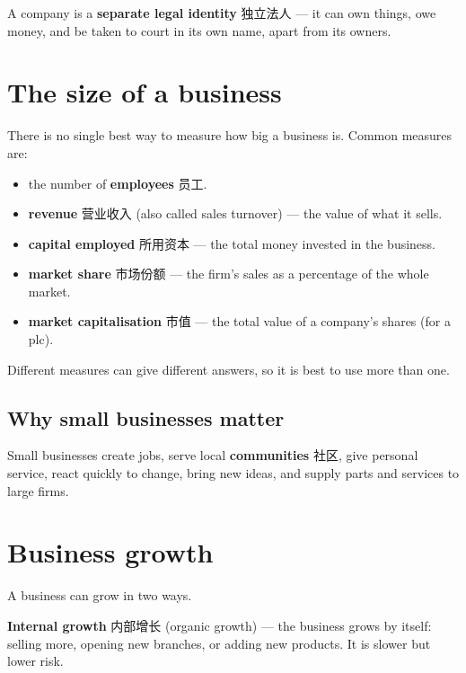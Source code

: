 \documentclass[11pt]{article}
\begin{document}
A company is a \textbf{separate legal identity} 独立法人 — it can own things, owe money, and be taken to court in its own name, apart from its owners.

\section*{The size of a business}

There is no single best way to measure how big a business is. Common measures are:

\begin{itemize}
\item the number of \textbf{employees} 员工.

\item \textbf{revenue} 营业收入 (also called sales turnover) — the value of what it sells.

\item \textbf{capital employed} 所用资本 — the total money invested in the business.

\item \textbf{market share} 市场份额 — the firm's sales as a percentage of the whole market.

\item \textbf{market capitalisation} 市值 — the total value of a company's shares (for a plc).

\end{itemize}

Different measures can give different answers, so it is best to use more than one.

\subsection*{Why small businesses matter}

Small businesses create jobs, serve local \textbf{communities} 社区, give personal service, react quickly to change, bring new ideas, and supply parts and services to large firms.

\section*{Business growth}

A business can grow in two ways.

\textbf{Internal growth} 内部增长 (organic growth) — the business grows by itself: selling more, opening new branches, or adding new products. It is slower but lower risk.
\end{document}
